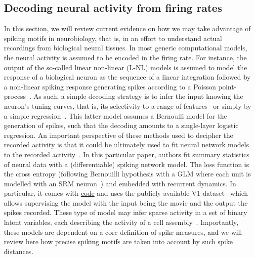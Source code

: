 \documentclass[brainsci, %
               review,submit,pdftex,moreauthors
               ]{Definitions/mdpi}
\begin{document}
\subsection{Decoding neural activity from firing rates}
In this section, we will review current evidence on how we may take advantage of spiking motifs in neurobiology, that is, in an effort to understand actual recordings from biological neural tissues. In most generic computational models, the neural activity is assumed to be encoded in the firing rate. For instance, the output of the so-called linear non-linear (L-NL) models is assumed to model the response of a biological neuron as the sequence of a linear integration followed by a non-linear spiking response generating spikes according to a Poisson point-process~\citep{simoncelli_characterization_2003}. As such, a simple decoding strategy is to infer the input knowing the neuron's tuning curves, that is, its selectivity to a range of features~\citep{jazayeri_optimal_2006} or simply by a simple regression~\citep{berens_fast_2012}. This latter model assumes a Bernoulli model for the generation of spikes, such that the decoding amounts to a single-layer logistic regression. An important perspective of these methods used to decipher the recorded activity is that it could be ultimately used to fit neural network models to the recorded activity~\citep{bellec_fitting_2021}. In this particular paper, authors fit summary statistics of neural data with a (differentiable) spiking network model. The loss function is the cross entropy (following Bernouilli hypothesis with a GLM where each unit is modelled with an SRM neuron~\citep{gerstner_time_1995}) and embedded with recurrent dynamics. In particular, it comes with \href{https://github.com/EPFL-LCN/pub-bellec-wang-2021-sample-and-measure}{code} and uses the publicly available V1 dataset~\citep{kohn_utah_2016} which allows supervising the model with the input being the movie and the output the spikes recorded. These type of model may infer sparse activity in a set of binary latent variables, each describing the activity of a cell assembly~\citep{warner_probabilistic_2022}.
 Importantly, these models are dependent on a core definition of spike measures, and we will review here how precise spiking motifs are taken into account by such spike distances.
%
\end{document}
